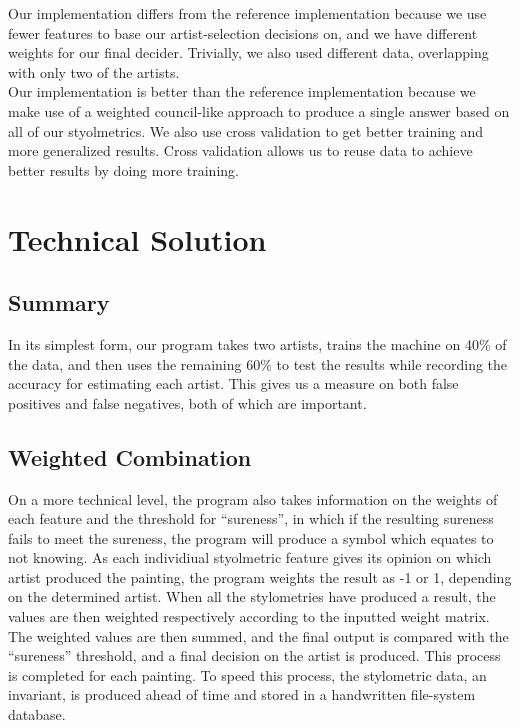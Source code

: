 \documentclass[twocolumn]{article}
\begin{document}
  Our implementation differs from the reference implementation because we use
  fewer features to base our artist-selection decisions on, and we have
  different weights for our final decider. Trivially, we also used different
  data, overlapping with only two of the artists. \\

  Our implementation is better than the reference implementation because we
  make use of a weighted council-like approach to produce a single answer
  based on all of our styolmetrics. We also use cross validation to get better
  training and more generalized results. Cross validation allows us to reuse
  data to achieve better results by doing more training.

  \section{Technical Solution}
  \subsection{Summary}
  In its simplest form, our program takes two artists, trains the machine on
  40\% of the data, and then uses the remaining 60\% to test the results while
  recording the accuracy for estimating each artist. This gives us a measure on
  both false positives and false negatives, both of which are important.

  \subsection{Weighted Combination}
  On a more technical level, the program also takes information on the weights
  of each feature and the threshold for ``sureness'', in which if the resulting
  sureness fails to meet the sureness, the program will produce a symbol which
  equates to not knowing. As each individiual styolmetric feature gives its
  opinion on which artist produced the painting, the program weights the result
  as -1 or 1, depending on the determined artist. When all the stylometries have
  produced a result, the values are then weighted respectively according to the
  inputted weight matrix. The weighted values are then summed, and the final
  output is compared with the ``sureness'' threshold, and a final decision on
  the artist is produced. This process is completed for each painting. To speed
  this process, the stylometric data, an invariant, is produced ahead of time
  and stored in a handwritten file-system database. \\
\end{document}
